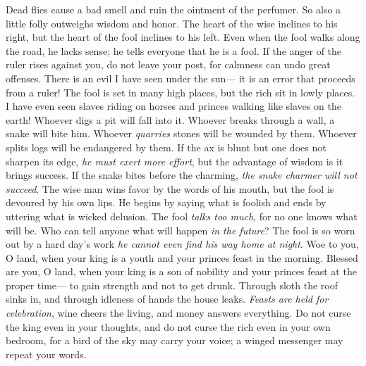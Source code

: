 \begin{biblechapter} %
\verse Dead flies cause a bad smell and ruin the ointment of the perfumer. 
So also a little folly outweighs wisdom and honor.
\verse The heart of the wise inclines to his right, 
but the heart of the fool inclines to his left.
\verse Even when the fool walks along the road, he lacks sense; 
he tells everyone that he is a fool.
\verse If the anger of the ruler rises against you, 
do not leave your post, 
for calmness can undo great offenses.
\verse There is an evil I have seen under the sun— 
it is an error that proceeds from a ruler!
\verse The fool is set in many high places, 
but the rich sit in lowly places.
\verse I have even seen slaves riding on horses 
and princes walking like slaves on the earth!
 Whoever digs a pit will fall into it. 
Whoever breaks through a wall, a snake will bite him.
\verse Whoever \textit{quarries} stones will be wounded by them. 
Whoever splits logs will be endangered by them.
 If the ax is blunt but one does not sharpen its edge, 
\textit{he must exert more effort}, 
but the advantage of wisdom is it brings success.
\verse If the snake bites before the charming, 
\textit{the snake charmer will not succeed}.
 The wise man wins favor by the words of his mouth, 
but the fool is devoured by his own lips.
\verse He begins by saying what is foolish 
and ends by uttering what is wicked delusion.
\verse The fool \textit{talks too much}, 
for no one knows what will be. 
Who can tell anyone what will happen \textit{in the future}?
\verse The fool is so worn out by a hard day’s work 
\textit{he cannot even find his way home at night}.
\verse Woe to you, O land, when your king is a youth 
and your princes feast in the morning.
\verse Blessed are you, O land, when your king is a son of nobility 
and your princes feast at the proper time— 
to gain strength and not to get drunk.
\verse Through sloth the roof sinks in, 
and through idleness of hands the house leaks.
\verse \textit{Feasts are held for celebration}, 
wine cheers the living, 
and money answers everything.
\verse Do not curse the king even in your thoughts, 
and do not curse the rich even in your own bedroom, 
for a bird of the sky may carry your voice; 
a winged messenger may repeat your words.
\end{biblechapter}

